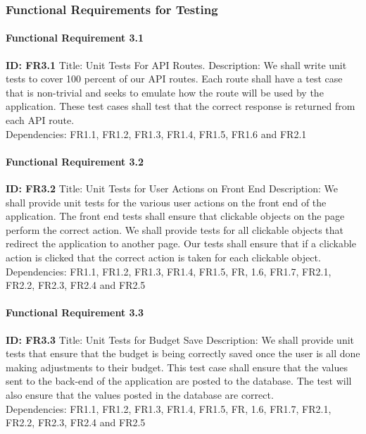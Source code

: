 \documentclass[onecolumn, draftclsnofoot,10pt, compsoc]{article}
\begin{document}
			\subsubsection{Functional Requirements for Testing}
				\paragraph{Functional Requirement 3.1}
				\textbf{ID: FR3.1}\hfill \break
				Title: Unit Tests For API Routes.\hfill \break
				Description: We shall write unit tests to cover 100 percent of our API routes. Each route shall have a test case that is non-trivial and seeks to emulate how the route will be used by the application. These test cases shall test that the correct response is returned from each API route.\\
				Dependencies: FR1.1, FR1.2, FR1.3, FR1.4, FR1.5, FR1.6 and FR2.1\hfill \break
				\paragraph{Functional Requirement 3.2}
				\textbf{ID: FR3.2}\hfill \break
				Title: Unit Tests for User Actions on Front End \hfill \break
				Description: We shall provide unit tests for the various user actions on the front end of the application. The front end tests shall ensure that clickable objects on the page perform the correct action. We shall provide tests for all clickable objects that redirect the application to another page. Our tests shall ensure that if a clickable action is clicked that the correct action is taken for each clickable object.\\
				Dependencies:  FR1.1, FR1.2, FR1.3, FR1.4, FR1.5, FR, 1.6, FR1.7, FR2.1, FR2.2, FR2.3, FR2.4 and FR2.5\hfill \break
				\paragraph{Functional Requirement 3.3}
				\textbf{ID: FR3.3}\hfill \break
				Title: Unit Tests for Budget Save \hfill \break
				Description: We shall provide unit tests that ensure that the budget is being correctly saved once the user is all done making adjustments to their budget. This test case shall ensure that the values sent to the back-end of the application are posted to the database. The test will also ensure that the values posted in the database are correct.\\
				Dependencies:  FR1.1, FR1.2, FR1.3, FR1.4, FR1.5, FR, 1.6, FR1.7, FR2.1, FR2.2, FR2.3, FR2.4 and FR2.5\hfill \break
\end{document}
